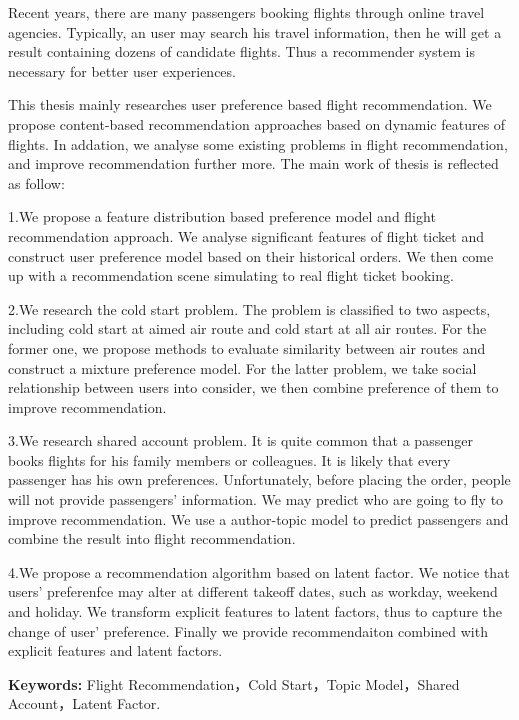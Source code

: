 \begin{englishabstract}

Recent years, there are many passengers booking flights through online travel agencies. Typically, an user may search his travel information, then he will get a result containing dozens of candidate flights. Thus a recommender system is necessary for better user experiences.

This thesis mainly researches user preference based flight recommendation. We propose content-based recommendation approaches based on dynamic features of flights. In addation, we analyse some existing problems in flight recommendation, and improve recommendation further more. The main work of thesis is reflected as follow:

1.We propose a feature distribution based preference model and flight recommendation approach. We analyse significant features of flight ticket and construct user preference model based on their historical orders. We then come up with a recommendation scene simulating to real flight ticket booking.

2.We research the cold start problem. The problem is classified to two aspects, including cold start at aimed air route and cold start at all air routes. For the former one, we propose methods to evaluate similarity between air routes and construct a mixture preference model. For the latter problem, we take social relationship between users into consider, we then combine preference of them to improve recommendation.

3.We research shared account problem. It is quite common that a passenger books flights for his family members or colleagues. It is likely that every passenger has his own preferences. Unfortunately, before placing the order, people will not provide passengers' information. We may predict who are going to fly to improve recommendation. We use a author-topic model to predict passengers and combine the result into flight recommendation.

4.We propose a recommendation algorithm based on latent factor. We notice that users' preferenfce may alter at different takeoff dates, such as workday, weekend and holiday. We transform explicit features to latent factors, thus to capture the change of user' preference. Finally we provide recommendaiton combined with explicit features and latent factors.


\textbf{Keywords:} Flight Recommendation，Cold Start，Topic Model，Shared Account，Latent Factor.
\end{englishabstract}


